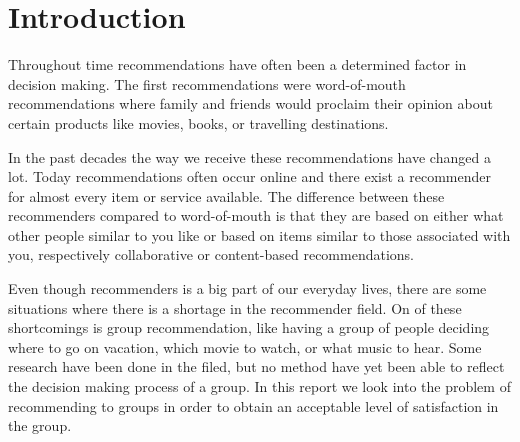 \chapter{Introduction} 
Throughout time recommendations have often been a determined factor in decision making.
The first recommendations were word-of-mouth recommendations where family and friends would proclaim their opinion about certain products like movies, books, or travelling destinations. 

In the past decades the way we receive these recommendations have changed a lot. Today recommendations often occur online and there exist a recommender for almost every item or service available. The difference between these recommenders compared to word-of-mouth is that they are based on either what other people similar to you like or based on items similar to those associated with you, respectively collaborative or content-based recommendations.

Even though recommenders is a big part of our everyday lives, there are some situations where there is a shortage in the recommender field. On of these shortcomings is group recommendation, like having a group of people deciding where to go on vacation, which movie to watch, or what music to hear. Some research have been done in the filed, but no method have yet been able to reflect the decision making process of a group. In this report we look into the problem of recommending to groups in order to obtain an acceptable level of satisfaction in the group.


